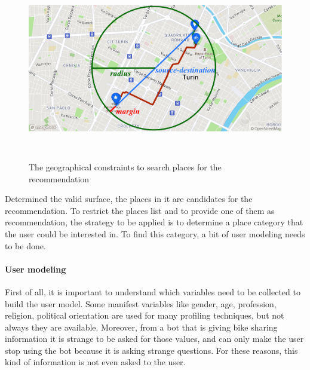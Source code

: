 
\begin{figure}[!htbp]
    \centering
    \includegraphics[max width=\linewidth,max height=8cm,keepaspectratio]{figures/placesSearch}
    \caption{The geographical constraints to search places for the recommendation}\label{fig:placesSearch}
\end{figure}

Determined the valid surface, the places in it are candidates for the recommendation. To restrict the places list and to provide one of them as recommendation, the strategy to be applied is to determine a place category that the user could be interested in. To find this category, a bit of user modeling needs to be done.

\paragraph{User modeling}
First of all, it is important to understand which variables need to be collected to build the user model. Some manifest variables like gender, age, profession, religion, political orientation are used for many profiling techniques, but not always they are available. Moreover, from a bot that is giving bike sharing information it is strange to be asked for those values, and can only make the user stop using the bot because it is asking strange questions. For these reasons, this kind of information is not even asked to the user.


